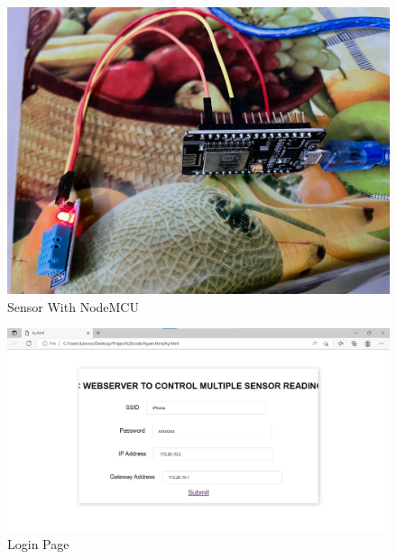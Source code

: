 \documentclass[12pt,a4paper,twocolumn,fleqn]{article}
\begin{document}
\begin{figure} [H]
\includegraphics[width=15cm]{media/SensorWeb1.jpeg}
\centering
\caption{Sensor With NodeMCU}
\end{figure}
\begin{figure} [H]
\includegraphics[width=15cm]{media/Login.jpeg}
\centering
\caption{Login Page}
\end{figure}
\end{document}
